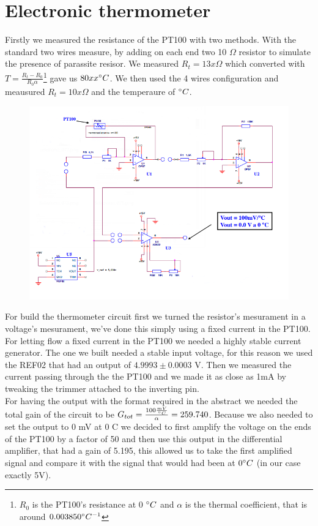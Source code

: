 \section{Electronic thermometer}
Firstly we measured the resistance of the PT100 with two methods. With the standard two wires measure, by adding on each end two 10 $\Omega$ resistor to simulate the presence of parassite resisor. We measured $R_t = 13x \Omega$ which converted with $T = \frac{R_t - R_0}{R_0 \alpha}$\footnote{ $R_0$ is the PT100's resistance at 0 $\degree C$ and $\alpha$ is the thermal coefficient, that is around $0.003850 \degree C^{-1}$  }
gave us $80 xx \degree C$. We then used the 4 wires configuration and meausured $R_t = 10x \Omega$ and the temperaure of  $\degree C$.
\begin{figure}[H]
\centering
\includegraphics[width=.7\textwidth]{6/circuit.png}
\end{figure}

For build the thermometer circuit first we turned the resistor's mesurament in a voltage's mesurament, we've done this simply using a fixed current in the PT100.
For letting flow a fixed current in the PT100 we needed a highly stable current generator. The one we built needed a stable input voltage, for this  reason we used the REF02 that had an output of $4.9993 \pm 0.0003$ V. Then we measured the current passing through the the PT100 and we made it as close as 1mA by tweaking the trimmer attached to the inverting pin.\\

For having the output with the format required in the abstract we needed the total gain of the circuit to be $G_{tot} = \frac{100 \frac{mV}{\degree C}}{\alpha} = 259.740$. Because we also needed to set the output to 0 mV at 0 \degree C we decided to first amplify the voltage on the ends of the PT100 by a factor of 50 and then use this output in the differential amplifier, that had a gain of 5.195, this allowed us to take the first amplified signal and compare it with the signal that would had been at $0\degree C$ (in our case exactly 5V).

